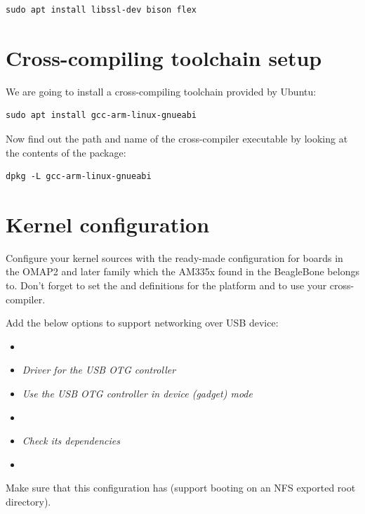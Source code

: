 \begin{verbatim}
sudo apt install libssl-dev bison flex
\end{verbatim}

\section{Cross-compiling toolchain setup}

We are going to install a cross-compiling toolchain provided by Ubuntu:

\begin{verbatim}
sudo apt install gcc-arm-linux-gnueabi
\end{verbatim}

Now find out the path and name of the cross-compiler executable by looking at the contents of the package:

\begin{verbatim}
dpkg -L gcc-arm-linux-gnueabi
\end{verbatim}

\section{Kernel configuration}

Configure your kernel sources with the ready-made configuration for boards in
the OMAP2 and later family which the AM335x found in the BeagleBone
belongs to. Don't forget to set the  and
 definitions for the  platform and to
use your cross-compiler.

Add the below options to support networking over USB device:
\begin{itemize}
  \item {}
  \item {} {\em Driver for the USB OTG
        controller}
  \item {} {\em Use the USB OTG controller
	in device (gadget) mode}
  \item {}
  \item {} {\em Check its dependencies}
  \item {}
\end{itemize}

Make sure that this configuration has  (support
booting on an NFS exported root directory).

